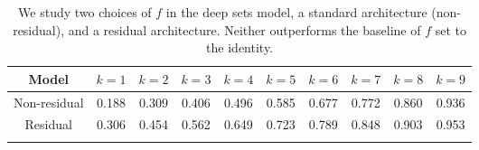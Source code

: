 
\begin{table}[!htbp]
\centering
\begin{tabular}{cccccccccc}
\toprule
Model & $k=1$ & $k=2$ & $k=3$ & $k=4$ & $k=5$ & $k=6$ & $k=7$ & $k=8$ & $k=9$ \\
\midrule
Non-residual & 0.188 & 0.309 & 0.406 & 0.496 & 0.585 & 0.677 & 0.772 & 0.860 & 0.936 \\
Residual & 0.306 & 0.454 & 0.562 & 0.649 & 0.723 & 0.789 & 0.848 & 0.903 & 0.953 \\
\bottomrule\\
\end{tabular}
\caption{We study two choices of $f$ in the deep sets model, a standard
architecture (non-residual), and a residual architecture. Neither outperforms
the baseline of $f$ set to the identity.}
\label{tab:residual}
\end{table}
